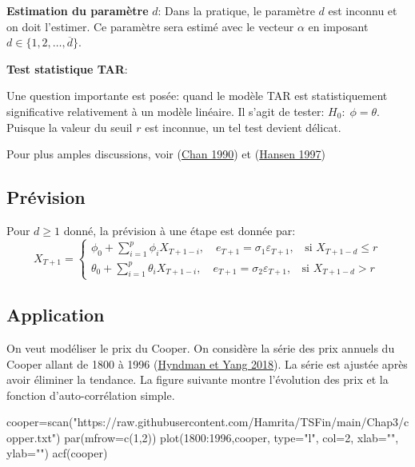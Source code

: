 \documentclass[
  french,
]{article}
\newenvironment{Shaded}{\begin{snugshade}}{\end{snugshade}}
\newcommand{\AttributeTok}[1]{\textcolor[rgb]{0.77,0.63,0.00}{#1}}
\newcommand{\DecValTok}[1]{\textcolor[rgb]{0.00,0.00,0.81}{#1}}
\newcommand{\FunctionTok}[1]{\textcolor[rgb]{0.00,0.00,0.00}{#1}}
\newcommand{\NormalTok}[1]{#1}
\newcommand{\OtherTok}[1]{\textcolor[rgb]{0.56,0.35,0.01}{#1}}
\newcommand{\SpecialCharTok}[1]{\textcolor[rgb]{0.00,0.00,0.00}{#1}}
\newcommand{\StringTok}[1]{\textcolor[rgb]{0.31,0.60,0.02}{#1}}
\begin{document}
\textbf{Estimation du paramètre} \(d\): Dans la pratique, le paramètre
\(d\) est inconnu et on doit l'estimer. Ce paramètre sera estimé avec le
vecteur \(\alpha\) en imposant \(d \in \{1,2,\ldots,\overline{d}\}\).

\textbf{Test statistique TAR}:

Une question importante est posée: quand le modèle TAR est
statistiquement significative relativement à un modèle linéaire. Il
s'agit de tester: \(H_0:\; \phi=\theta\). Puisque la valeur du seuil
\(r\) est inconnue, un tel test devient délicat.

Pour plus amples discussions, voir (\protect\hyperlink{ref-chan90}{Chan
1990}) et (\protect\hyperlink{ref-hansen97}{Hansen 1997})

\hypertarget{pruxe9vision}{%
\subsection{Prévision}\label{pruxe9vision}}

Pour \(d \geq 1\) donné, la prévision à une étape est donnée par: \[
X_{T+1}=\begin{cases}
\phi_0+\displaystyle\sum_{i=1}^p\phi_iX_{T+1-i},\quad e_{T+1}=\sigma_1\varepsilon_{T+1},\;\;\text{ si } X_{T+1-d}\leq r\\
\theta_0+\displaystyle\sum_{i=1}^p\theta_iX_{T+1-i},\quad e_{T+1}=\sigma_2\varepsilon_{T+1},\;\;\text{ si } X_{T+1-d}> r
\end{cases}
\]

\hypertarget{application}{%
\subsection{Application}\label{application}}

On veut modéliser le prix du Cooper. On considère la série des prix
annuels du Cooper allant de 1800 à 1996
(\protect\hyperlink{ref-hyndman2016}{Hyndman et Yang 2018}). La série
est ajustée après avoir éliminer la tendance. La figure suivante montre
l'évolution des prix et la fonction d'auto-corrélation simple.

\begin{Shaded}
\begin{Highlighting}[]
\NormalTok{cooper}\OtherTok{=}\FunctionTok{scan}\NormalTok{(}\StringTok{"https://raw.githubusercontent.com/Hamrita/TSFin/main/Chap3/copper.txt"}\NormalTok{)}
\FunctionTok{par}\NormalTok{(}\AttributeTok{mfrow=}\FunctionTok{c}\NormalTok{(}\DecValTok{1}\NormalTok{,}\DecValTok{2}\NormalTok{))}
\FunctionTok{plot}\NormalTok{(}\DecValTok{1800}\SpecialCharTok{:}\DecValTok{1996}\NormalTok{,cooper, }\AttributeTok{type=}\StringTok{"l"}\NormalTok{, }\AttributeTok{col=}\DecValTok{2}\NormalTok{, }\AttributeTok{xlab=}\StringTok{""}\NormalTok{, }\AttributeTok{ylab=}\StringTok{""}\NormalTok{)}
\FunctionTok{acf}\NormalTok{(cooper)}
\end{Highlighting}
\end{Shaded}
\end{document}
